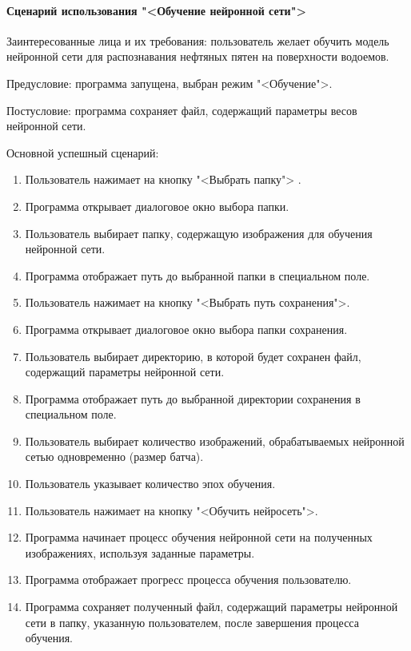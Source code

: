 \paragraph{Сценарий использования "<Обучение нейронной сети">}

Заинтересованные лица и их требования: пользователь желает обучить модель нейронной сети для распознавания нефтяных пятен на поверхности водоемов.

Предусловие: программа запущена, выбран режим "<Обучение">.

Постусловие: программа сохраняет файл, содержащий параметры весов нейронной сети.

Основной успешный сценарий:

\begin{enumerate}
	\item Пользователь нажимает на кнопку "<Выбрать папку">	.
	\item Программа открывает диалоговое окно выбора папки.
	\item Пользователь выбирает папку, содержащую изображения для обучения нейронной сети.
	\item Программа отображает путь до выбранной папки в специальном поле.
	\item Пользователь нажимает на кнопку "<Выбрать путь сохранения">.
	\item Программа открывает диалоговое окно выбора папки сохранения.
	\item Пользователь выбирает директорию, в которой будет сохранен файл, содержащий параметры нейронной сети.
	\item Программа отображает путь до выбранной директории сохранения в специальном поле.
	\item Пользователь выбирает количество изображений, обрабатываемых нейронной сетью одновременно (размер батча).
	\item Пользователь указывает количество эпох обучения.
	\item Пользователь нажимает на кнопку "<Обучить нейросеть">.
	\item Программа начинает процесс обучения нейронной сети на полученных изображениях, используя заданные параметры.
	\item Программа отображает прогресс процесса обучения пользователю.
	\item Программа сохраняет полученный файл, содержащий параметры нейронной сети в папку, указанную пользователем, после завершения процесса обучения.
\end{enumerate}

